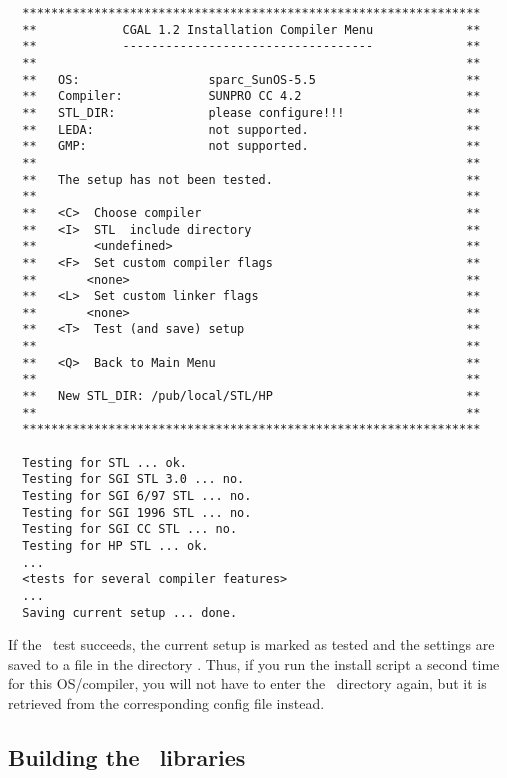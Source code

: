 {\scriptsize
\begin{verbatim}
  ****************************************************************
  **            CGAL 1.2 Installation Compiler Menu             **
  **            -----------------------------------             **
  **                                                            **
  **   OS:                  sparc_SunOS-5.5                     **
  **   Compiler:            SUNPRO CC 4.2                       **
  **   STL_DIR:             please configure!!!                 **
  **   LEDA:                not supported.                      **
  **   GMP:                 not supported.                      **
  **                                                            **
  **   The setup has not been tested.                           **
  **                                                            **
  **   <C>  Choose compiler                                     **
  **   <I>  STL  include directory                              **
  **        <undefined>                                         **
  **   <F>  Set custom compiler flags                           **
  **       <none>                                               **
  **   <L>  Set custom linker flags                             **
  **       <none>                                               **
  **   <T>  Test (and save) setup                               **
  **                                                            **
  **   <Q>  Back to Main Menu                                   **
  **                                                            **
  **   New STL_DIR: /pub/local/STL/HP                           **
  **                                                            **
  ****************************************************************

  Testing for STL ... ok.
  Testing for SGI STL 3.0 ... no.
  Testing for SGI 6/97 STL ... no.
  Testing for SGI 1996 STL ... no.
  Testing for SGI CC STL ... no.
  Testing for HP STL ... ok.
  ...
  <tests for several compiler features>
  ...
  Saving current setup ... done.
\end{verbatim}}

If the \stl\ test succeeds, the current setup is marked as tested and
the settings are saved to a file in the directory \cgalinstconfdir.
Thus, if you run the install script a second time for this
OS/compiler, you will not have to enter the \stl\ directory again, but
it is retrieved from the corresponding config file instead.

\subsection{Building the \cgal\ libraries}\label{sec:build-the-libs}

